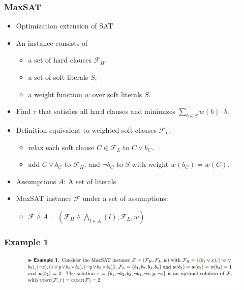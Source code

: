 \documentclass[aspectratio=169 %
,serif,mathserif]{beamer}
\begin{document}
\begin{frame}
	\frametitle{MaxSAT}
	\begin{itemize}
		\item Optimization extension of SAT
		\item An instance consists of
		\begin{itemize}
			\item a set of hard clauses $\mathcal{F}_H$,
			\item a set of soft literals $S$,
			\item a weight function $w$ over soft literals $S$.
		\end{itemize}
		\item Find $\tau$ that satisfies all hard clauses and minimizes $\sum_{b \in S} w(b) \cdot b$. \pause
		\item Definition equivalent to weighted soft clauses $\mathcal{F}_L$:
		\begin{itemize}
			\item relax each soft clause $C \in \mathcal{F}_L$ to $C \vee  b_C$.
			\item add $C \vee b_C$ to $\mathcal{F}_H$, and $\neg b_C$ to $S$ with weight $w\left(b_C\right)=w(C)$.
		\end{itemize}
		\item Assumptions $A$: A set of literals
		\item MaxSAT instance $\mathcal{F}$ under a set of assumptions:
			\begin{itemize}
				\item $\mathcal{F} \wedge A=\left(\mathcal{F}_H \wedge \bigwedge_{l \in A}(l), \mathcal{F}_L, w\right)$
			\end{itemize}
	\end{itemize}
\end{frame}

\begin{frame}
	\frametitle{Example 1}
	\begin{figure}[htbp]
		\includegraphics[width=1\linewidth]{1.png}
	\end{figure}
\end{frame}
\end{document}
